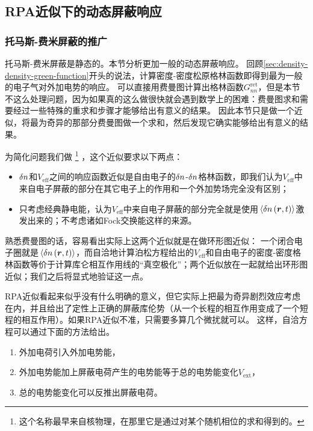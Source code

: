 \subsection{RPA近似下的动态屏蔽响应}\label{sec:rpa-semi-classical-dynamical}

\subsubsection{托马斯-费米屏蔽的推广}

托马斯-费米屏蔽是静态的。本节分析更加一般的动态屏蔽响应。
回顾\autoref{sec:density-density-green-function}开头的说法，计算密度-密度松原格林函数即得到最为一般的电子气对外加电势的响应。
可以直接用费曼图计算出格林函数$G^\text{ret}_{nn}$，但是本节不这么处理问题，因为如果真的这么做很快就会遇到数学上的困难：费曼图求和需要经过一些特殊的重求和步骤才能够给出有意义的结果。
因此本节只是做一个近似，将最为奇异的那部分费曼图做一个求和，然后发现它确实能够给出有意义的结果。

为简化问题我们做%
\footnote{这个名称最早来自核物理，在那里它是通过对某个随机相位的求和得到的。}%
，这个近似要求以下两点：
\begin{itemize}
    \item $\var{{n}}$和$V_\text{eff}$之间的响应函数近似是自由电子的$\var{{n}}$-$\var{{n}}$格林函数，即我们认为$V_\text{eff}$中来自电子屏蔽的部分在其它电子上的作用和一个外加势场完全没有区别；
    \item 只考虑经典静电能，认为$V_\text{eff}$中来自电子屏蔽的部分完全就是使用$\expval*{\var{n}(\vb*{r}, t)}$激发出来的；不考虑诸如Fock交换能这样的来源。
\end{itemize}
熟悉费曼图的话，容易看出实际上这两个近似就是在做环形图近似：
一个闭合电子圈就是$\expval*{\var{n}(\vb*{r}, t)}$，而自洽地计算泊松方程给出的$V_{\text{eff}}$和自由电子的密度-密度格林函数等价于计算库仑相互作用线的“真空极化”；两个近似放在一起就给出环形图近似；我们之后将显式地验证这一点。

RPA近似看起来似乎没有什么明确的意义，但它实际上把最为奇异剧烈效应考虑在内，并且给出了定性上正确的屏蔽库伦势（从一个长程的相互作用变成了一个短程的相互作用）。如果RPA近似不准，只需要多算几个微扰就可以。
这样，自洽方程可以通过下面的方法给出。
\begin{enumerate}
    \item 外加电荷引入外加电势能，
    \item 外加电势能加上屏蔽电荷产生的电势能等于总的电势能变化$V_\text{ext}$，
    \item 总的电势能变化可以反推出屏蔽电荷。
\end{enumerate}

